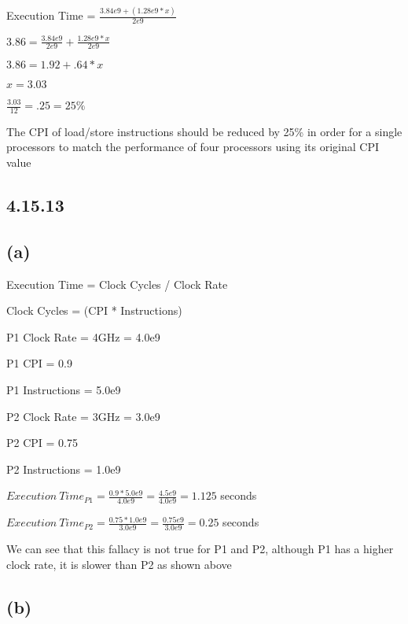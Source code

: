 \documentclass{article}
\begin{document}
    Execution Time = $\frac{3.84e9 + (1.28e9 * x)}{2e9}$
    \vspace*{6pt}

    $3.86 = \frac{3.84e9}{2e9} + \frac{1.28e9 * x}{2e9}$
    \vspace*{6pt}

    $3.86 = 1.92 + .64 * x$
    \vspace*{6pt}

    $x = 3.03$

    $\frac{3.03}{12} = .25 = 25\%$ 
    \vspace*{6pt}

    The CPI of load/store instructions should be reduced by 25\% in order for a single processors to match the performance of four processors using its original CPI value

    \subsection*{4.15.13}

    \subsection*{(a)}

    Execution Time = Clock Cycles / Clock Rate

    Clock Cycles = (CPI * Instructions)

    P1 Clock Rate = 4GHz = 4.0e9
    
    P1 CPI = 0.9

    P1 Instructions = 5.0e9
    \vspace*{6pt}

    P2 Clock Rate = 3GHz = 3.0e9
    
    P2 CPI = 0.75

    P2 Instructions = 1.0e9
    \vspace*{6pt}

    $Execution\ Time_{P1} = \frac{0.9 * 5.0e9}{4.0e9} = \frac{4.5e9}{4.0e9} = 1.125$ seconds

    $Execution\ Time_{P2} = \frac{0.75 * 1.0e9}{3.0e9} = \frac{0.75e9}{3.0e9} = 0.25$ seconds

    We can see that this fallacy is not true for P1 and P2, although P1 has a higher clock rate, it is slower than P2 as shown above

    \subsection*{(b)}
\end{document}
